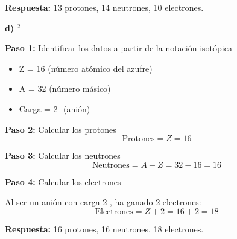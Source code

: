\begin{exercise}
\begin{solu}
        \textbf{Respuesta:} 13 protones, 14 neutrones, 10 electrones.

        \textbf{d) $^{2-}$}

        \textbf{Paso 1:} Identificar los datos a partir de la notación isotópica
        \begin{itemize}
            \item Z = 16 (número atómico del azufre)
            \item A = 32 (número másico)
            \item Carga = 2- (anión)
        \end{itemize}

        \textbf{Paso 2:} Calcular los protones
        \[
            \text{Protones} = Z = 16
        \]

        \textbf{Paso 3:} Calcular los neutrones
        \[
            \text{Neutrones} = A - Z = 32 - 16 = 16
        \]

        \textbf{Paso 4:} Calcular los electrones

        Al ser un anión con carga 2-, ha ganado 2 electrones:
        \[
            \text{Electrones} = Z + 2 = 16 + 2 = 18
        \]

        \textbf{Respuesta:} 16 protones, 16 neutrones, 18 electrones.
    \end{solu}
\end{exercise}

